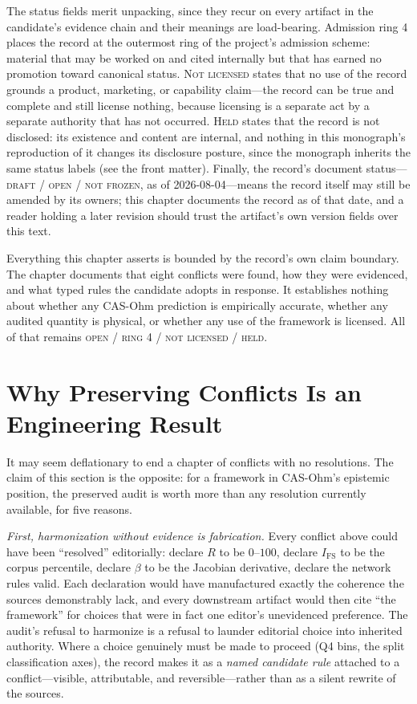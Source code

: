 The status fields merit unpacking, since they recur on every artifact in the
candidate's evidence chain and their meanings are load-bearing. Admission
ring 4 places the record at the outermost ring of the project's admission
scheme: material that may be worked on and cited internally but that has
earned no promotion toward canonical status. \textsc{Not licensed} states
that no use of the record grounds a product, marketing, or capability
claim---the record can be true and complete and still license nothing,
because licensing is a separate act by a separate authority that has not
occurred. \textsc{Held} states that the record is not disclosed: its
existence and content are internal, and nothing in this monograph's
reproduction of it changes its disclosure posture, since the monograph
inherits the same status labels (see the front matter). Finally, the
record's document status---\textsc{draft / open / not frozen}, as of
2026-08-04---means the record itself may still be amended by its owners; this
chapter documents the record as of that date, and a reader holding a later
revision should trust the artifact's own version fields over this text.

\begin{boundary}\label{ch04:bound:record}
Everything this chapter asserts is bounded by the record's own claim
boundary. The chapter documents that eight conflicts were found, how they
were evidenced, and what typed rules the candidate adopts in response. It
establishes nothing about whether any CAS-Ohm prediction is empirically
accurate, whether any audited quantity is physical, or whether any use of the
framework is licensed. All of that remains \textsc{open / ring 4 / not
licensed / held}.
\end{boundary}

\section{Why Preserving Conflicts Is an Engineering Result}\label{ch04:preservation}

It may seem deflationary to end a chapter of conflicts with no resolutions.
The claim of this section is the opposite: for a framework in CAS-Ohm's
epistemic position, the preserved audit is worth more than any resolution
currently available, for five reasons.

\emph{First, harmonization without evidence is fabrication.} Every conflict
above could have been ``resolved'' editorially: declare $R$ to be $0$--$100$,
declare $I_{\mathrm{FS}}$ to be the corpus percentile, declare $\beta$ to be
the Jacobian derivative, declare the network rules valid. Each declaration
would have manufactured exactly the coherence the sources demonstrably lack,
and every downstream artifact would then cite ``the framework'' for choices
that were in fact one editor's unevidenced preference. The audit's refusal to
harmonize is a refusal to launder editorial choice into inherited authority.
Where a choice genuinely must be made to proceed (Q4 bins, the split
classification axes), the record makes it as a \emph{named candidate rule}
attached to a conflict---visible, attributable, and reversible---rather than
as a silent rewrite of the sources.

